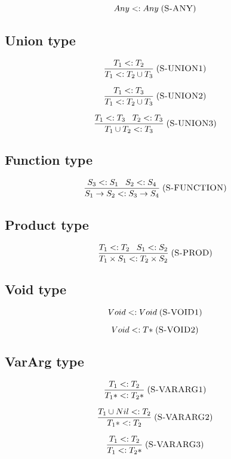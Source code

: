 \documentclass[12pt]{article}
\newcommand{\mylabel}[1]{\; (\textsc{#1})}
\newcommand{\subtype}{<:}
\begin{document}
\[
Any \subtype Any
\mylabel{S-ANY}
\]

\subsection{Union type}

\[
\frac{T_{1} \subtype T_{2}}
     {T_{1} \subtype T_{2} \cup T_{3}}
\mylabel{S-UNION1}
\]

\[
\frac{T_{1} \subtype T_{3}}
     {T_{1} \subtype T_{2} \cup T_{3}}
\mylabel{S-UNION2}
\]

\[
\frac{T_{1} \subtype T_{3} \;\;\; T_{2} \subtype T_{3}}
     {T_{1} \cup T_{2} \subtype T_{3}}
\mylabel{S-UNION3}
\]

\subsection{Function type}

\[
\frac{S_{3} \subtype S_{1} \;\;\; S_{2} \subtype S_{4}}
     {S_{1} \rightarrow S_{2} \subtype S_{3} \rightarrow S_{4}}
\mylabel{S-FUNCTION}
\]

\subsection{Product type}

\[
\frac{T_{1} \subtype T_{2} \;\;\; S_{1} \subtype S_{2}}
     {T_{1} \times S_{1} \subtype T_{2} \times S_{2}}
\mylabel{S-PROD}
\]

\subsection{Void type}

\[
Void \subtype Void
\mylabel{S-VOID1}
\]

\[
Void \subtype {T*}
\mylabel{S-VOID2}
\]


\subsection{VarArg type}

\[
\frac{T_{1} \subtype T_{2}}
     {{T_{1}*} \subtype {T_{2}*}}
\mylabel{S-VARARG1}
\]

\[
\frac{T_{1} \cup Nil \subtype T_{2}}
     {{T_{1}*} \subtype T_{2}}
\mylabel{S-VARARG2}
\]

\[
\frac{T_{1} \subtype T_{2}}
     {T_{1} \subtype {T_{2}*}}
\mylabel{S-VARARG3}
\]

%
\end{document}

